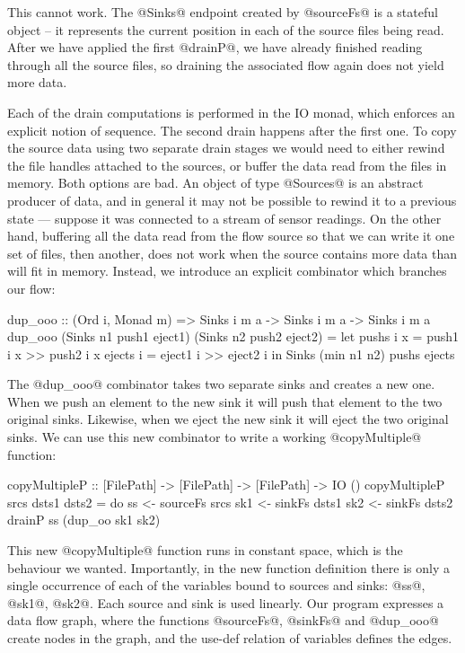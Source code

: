 This cannot work. The @Sinks@ endpoint created by @sourceFs@ is a stateful object -- it represents the current position in each of the source files being read. After we have applied the first @drainP@, we have already finished reading through all the source files, so draining the associated flow again does not yield more data. 

Each of the drain computations is performed in the IO monad, which enforces an explicit notion of sequence. The second drain happens after the first one. To copy the source data using two separate drain stages we would need to either rewind the file handles attached to the sources, or buffer the data read from the files in memory. Both options are bad. An object of type @Sources@ is an abstract producer of data, and in general it may not be possible to rewind it to a previous state --- suppose it was connected to a stream of sensor readings. On the other hand, buffering all the data read from the flow source so that we can write it one set of files, then another, does not work when the source contains more data than will fit in memory. Instead, we introduce an explicit combinator which branches our flow:

\begin{code}
dup_ooo :: (Ord i, Monad m)
       => Sinks i m a -> Sinks i m a -> Sinks i m a
dup_ooo (Sinks n1 push1 eject1) 
        (Sinks n2 push2 eject2)
 = let pushs  i x = push1 i x >> push2 i x
       ejects i   = eject1 i  >> eject2 i
   in  Sinks (min n1 n2) pushs ejects
\end{code}

The @dup_ooo@ combinator takes two separate sinks and creates a new one. When we push an element to the new sink it will push that element to the two original sinks. Likewise, when we eject the new sink it will eject the two original sinks. We can use this new combinator to write a working @copyMultiple@ function:

\begin{code}
copyMultipleP 
 :: [FilePath] -> [FilePath] -> [FilePath] -> IO ()
copyMultipleP srcs dsts1 dsts2
 = do  ss  <- sourceFs srcs
       sk1 <- sinkFs   dsts1
       sk2 <- sinkFs   dsts2 
       drainP ss (dup_oo sk1 sk2)
\end{code}

This new @copyMultiple@ function runs in constant space, which is the behaviour we wanted. Importantly, in the new function definition there is only a single occurrence of each of the variables bound to sources and sinks: @ss@, @sk1@, @sk2@. Each source and sink is used linearly. Our program expresses a data flow graph, where the functions @sourceFs@, @sinkFs@ and @dup_ooo@ create nodes in the graph, and the use-def relation of variables defines the edges.


